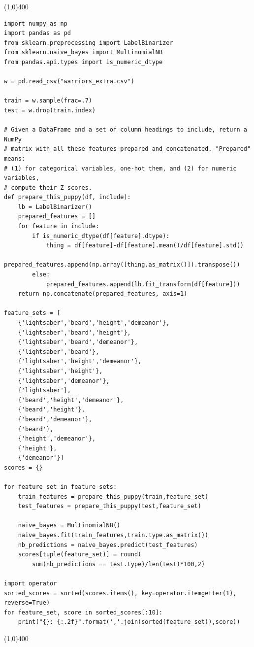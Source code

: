 \documentclass[12pt]{article}
\begin{document}
\pagebreak
\begin{center}
\line(1,0){400}
\end{center}
\scriptsize
\begin{Verbatim}[fontsize=\small,samepage=true,frame=none]
import numpy as np
import pandas as pd
from sklearn.preprocessing import LabelBinarizer
from sklearn.naive_bayes import MultinomialNB
from pandas.api.types import is_numeric_dtype

w = pd.read_csv("warriors_extra.csv")

train = w.sample(frac=.7)
test = w.drop(train.index)

# Given a DataFrame and a set of column headings to include, return a NumPy
# matrix with all these features prepared and concatenated. "Prepared" means:
# (1) for categorical variables, one-hot them, and (2) for numeric variables,
# compute their Z-scores.
def prepare_this_puppy(df, include):
    lb = LabelBinarizer()
    prepared_features = []
    for feature in include:
        if is_numeric_dtype(df[feature].dtype):
            thing = df[feature]-df[feature].mean()/df[feature].std()
            prepared_features.append(np.array([thing.as_matrix()]).transpose())
        else:
            prepared_features.append(lb.fit_transform(df[feature]))
    return np.concatenate(prepared_features, axis=1)

feature_sets = [
    {'lightsaber','beard','height','demeanor'},
    {'lightsaber','beard','height'},
    {'lightsaber','beard','demeanor'},
    {'lightsaber','beard'},
    {'lightsaber','height','demeanor'},
    {'lightsaber','height'},
    {'lightsaber','demeanor'},
    {'lightsaber'},
    {'beard','height','demeanor'},
    {'beard','height'},
    {'beard','demeanor'},
    {'beard'},
    {'height','demeanor'},
    {'height'},
    {'demeanor'}]
scores = {}

for feature_set in feature_sets:
    train_features = prepare_this_puppy(train,feature_set)
    test_features = prepare_this_puppy(test,feature_set)

    naive_bayes = MultinomialNB()
    naive_bayes.fit(train_features,train.type.as_matrix())
    nb_predictions = naive_bayes.predict(test_features)
    scores[tuple(feature_set)] = round(
        sum(nb_predictions == test.type)/len(test)*100,2)

import operator
sorted_scores = sorted(scores.items(), key=operator.itemgetter(1), reverse=True)
for feature_set, score in sorted_scores[:10]:
    print("{}: {:.2f}".format(','.join(sorted(feature_set)),score))
\end{Verbatim}
\normalsize
\begin{center}
\line(1,0){400}
\end{center}
\end{document}
